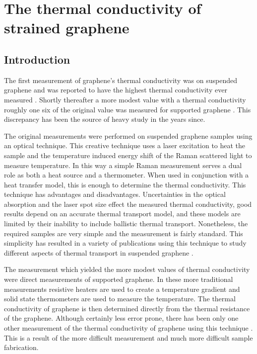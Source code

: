 \chapter{The thermal conductivity of strained graphene\label{chap:therm}}

\section{Introduction}
The first measurement of graphene's thermal conductivity was on suspended graphene and was reported to have the highest thermal conductivity ever measured \cite{Balandin2008}.
Shortly thereafter a more modest value with a thermal conductivity roughly one six of the original value was measured for supported graphene \cite{Seol2010}.
This discrepancy has been the source of heavy study in the years since.

The original measurements were performed on suspended graphene samples using an optical technique.
This creative technique uses a laser excitation to heat the sample and the temperature induced energy shift of the Raman scattered light to measure temperature.
In this way a simple Raman measurement serves a dual role as both a heat source and a thermometer.
When used in conjunction with a heat transfer model, this is enough to determine the thermal conductivity.
This technique has advantages and disadvantages.
Uncertainties in the optical absorption and the laser spot size effect the measured thermal conductivity, good results depend on an accurate thermal transport model, and these models are limited by their inability to include ballistic thermal transport.
Nonetheless, the required samples are very simple and the measurement is fairly standard.
This simplicity has resulted in a variety of publications using this technique to study different aspects of thermal transport in suspended graphene \cite{Balandin2008,Faugeras2010,Cai2010,Ghosh2010,Lee2011,Chen2011a,Chen2012}.

The measurement which yielded the more modest values of thermal conductivity were direct measurements of supported graphene.
In these more traditional measurements resistive heaters are used to create a temperature gradient and solid state thermometers are used to measure the temperature.
The thermal conductivity of graphene is then determined directly from the thermal resistance of the graphene.
Although certainly less error prone, there has been only one other measurement of the thermal conductivity of graphene using this technique \cite{Jang2010}.
This is a result of the more difficult measurement and much more difficult sample fabrication.

